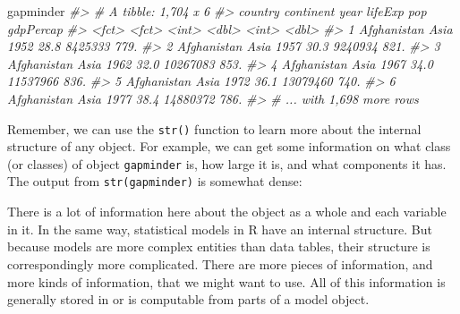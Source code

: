 \documentclass[]{book}
\newenvironment{Shaded}{\begin{snugshade}}{\end{snugshade}}
\newcommand{\CommentTok}[1]{\textcolor[rgb]{0.56,0.35,0.01}{\textit{#1}}}
\newcommand{\KeywordTok}[1]{\textcolor[rgb]{0.13,0.29,0.53}{\textbf{#1}}}
\newcommand{\NormalTok}[1]{#1}
\begin{document}
\begin{Shaded}
\begin{Highlighting}[]
\NormalTok{gapminder}
\CommentTok{#> # A tibble: 1,704 x 6}
\CommentTok{#>   country     continent  year lifeExp      pop gdpPercap}
\CommentTok{#>   <fct>       <fct>     <int>   <dbl>    <int>     <dbl>}
\CommentTok{#> 1 Afghanistan Asia       1952    28.8  8425333      779.}
\CommentTok{#> 2 Afghanistan Asia       1957    30.3  9240934      821.}
\CommentTok{#> 3 Afghanistan Asia       1962    32.0 10267083      853.}
\CommentTok{#> 4 Afghanistan Asia       1967    34.0 11537966      836.}
\CommentTok{#> 5 Afghanistan Asia       1972    36.1 13079460      740.}
\CommentTok{#> 6 Afghanistan Asia       1977    38.4 14880372      786.}
\CommentTok{#> # ... with 1,698 more rows}
\end{Highlighting}
\end{Shaded}

Remember, we can use the \texttt{str()} function to learn more about the internal structure of any object. For example, we can get some information on what class (or classes) of object \texttt{gapminder} is, how large it is, and what components it has. The output from \texttt{str(gapminder)} is somewhat dense:\\

\begin{Shaded}
\end{Shaded}

There is a lot of information here about the object as a whole and each variable in it. In the same way, statistical models in R have an internal structure. But because models are more complex entities than data tables, their structure is correspondingly more complicated. There are more pieces of information, and more kinds of information, that we might want to use. All of this information is generally stored in or is computable from parts of a model object.
\end{document}
